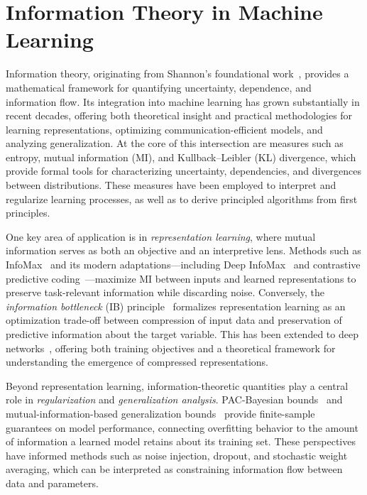 \documentclass[11pt, oneside]{book}
\theoremstyle{plain}
\theoremstyle{definition}
\theoremstyle{remark}
\begin{document}
\section{Information Theory in Machine Learning}

Information theory, originating from Shannon’s foundational work~\citep{shannon1948mathematical}, provides a mathematical framework for quantifying uncertainty, dependence, and information flow. Its integration into machine learning has grown substantially in recent decades, offering both theoretical insight and practical methodologies for learning representations, optimizing communication-efficient models, and analyzing generalization. At the core of this intersection are measures such as entropy, mutual information (MI), and Kullback–Leibler (KL) divergence, which provide formal tools for characterizing uncertainty, dependencies, and divergences between distributions. These measures have been employed to interpret and regularize learning processes, as well as to derive principled algorithms from first principles.

One key area of application is in \emph{representation learning}, where mutual information serves as both an objective and an interpretive lens. Methods such as InfoMax~\citep{linsker1988self} and its modern adaptations—including Deep InfoMax~\citep{hjelm2019learning} and contrastive predictive coding~\citep{oord2018representation}—maximize MI between inputs and learned representations to preserve task-relevant information while discarding noise. Conversely, the \emph{information bottleneck} (IB) principle~\citep{tishby2000information} formalizes representation learning as an optimization trade-off between compression of input data and preservation of predictive information about the target variable. This has been extended to deep networks~\citep{alemi2017deep}, offering both training objectives and a theoretical framework for understanding the emergence of compressed representations.

Beyond representation learning, information-theoretic quantities play a central role in \emph{regularization} and \emph{generalization analysis}. PAC-Bayesian bounds~\citep{mcallester1999pac} and mutual-information-based generalization bounds~\citep{xu2017information} provide finite-sample guarantees on model performance, connecting overfitting behavior to the amount of information a learned model retains about its training set. These perspectives have informed methods such as noise injection, dropout, and stochastic weight averaging, which can be interpreted as constraining information flow between data and parameters.
\end{document}
